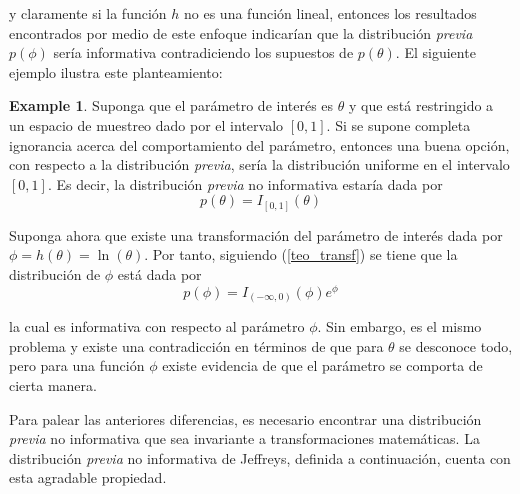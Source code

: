 \documentclass[
  spanish,
  letter]{book}
\theoremstyle{definition}
\theoremstyle{definition}
\newtheorem{example}{Example}[chapter]
\theoremstyle{definition}
\theoremstyle{remark}
\begin{document}
y claramente si la función \(h\) no es una función lineal, entonces los resultados encontrados por medio de este enfoque indicarían que la distribución \emph{previa} \(p(\phi)\) sería informativa contradiciendo los supuestos de \(p(\theta)\). El siguiente ejemplo ilustra este planteamiento:

\begin{example}
\protect\hypertarget{exm:unnamed-chunk-31}{}{\label{exm:unnamed-chunk-31} }Suponga que el parámetro de interés es \(\theta\) y que está restringido a un espacio de muestreo dado por el intervalo \([0,1]\). Si se supone completa ignorancia acerca del comportamiento del parámetro, entonces una buena opción, con respecto a la distribución \emph{previa}, sería la distribución uniforme en el intervalo \([0,1]\). Es decir, la distribución \emph{previa} no informativa estaría dada por
\begin{equation*}
p(\theta) = I_{[0,1]}(\theta)
\end{equation*}

Suponga ahora que existe una transformación del parámetro de interés dada por \(\phi=h(\theta)=\ln(\theta)\). Por tanto, siguiendo (\ref{teo_transf}) se tiene que la distribución de \(\phi\) está dada por
\begin{equation*}
p(\phi)=I_{(-\infty,0)}(\phi)e^{\phi}
\end{equation*}

la cual es informativa con respecto al parámetro \(\phi\). Sin embargo, es el mismo problema y existe una contradicción en términos de que para \(\theta\) se desconoce todo, pero para una función \(\phi\) existe evidencia de que el parámetro se comporta de cierta manera.
\end{example}

Para palear las anteriores diferencias, es necesario encontrar una distribución \emph{previa} no informativa que sea invariante a transformaciones matemáticas. La distribución \emph{previa} no informativa de Jeffreys, definida a continuación, cuenta con esta agradable propiedad.
\end{document}
